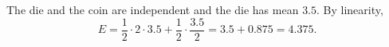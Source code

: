 The die and the coin are independent and the die has mean $3.5$. By linearity,
\[
E=\dfrac{1}{2}\cdot2\cdot3.5+\dfrac{1}{2}\cdot\dfrac{3.5}{2}=3.5+0.875=\boxed{4.375}.
\]
